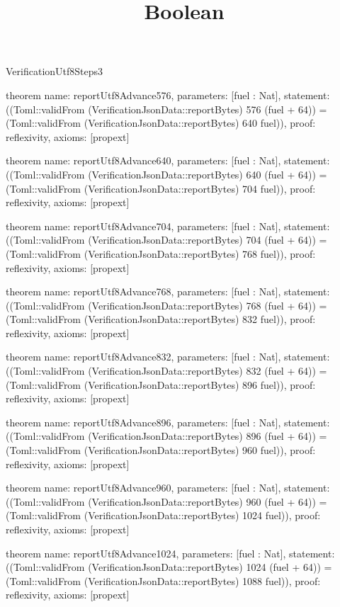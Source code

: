 \begin{lexlean}{VerificationUtf8Steps3}
\title{Boolean}
\begin{semanticmodule}

theorem{
  name: reportUtf8Advance576,
  parameters: [fuel : Nat],
  statement: ((Toml::validFrom (VerificationJsonData::reportBytes) 576 (fuel + 64)) = (Toml::validFrom (VerificationJsonData::reportBytes) 640 fuel)),
  proof: reflexivity{},
  axioms: [propext]
}

theorem{
  name: reportUtf8Advance640,
  parameters: [fuel : Nat],
  statement: ((Toml::validFrom (VerificationJsonData::reportBytes) 640 (fuel + 64)) = (Toml::validFrom (VerificationJsonData::reportBytes) 704 fuel)),
  proof: reflexivity{},
  axioms: [propext]
}

theorem{
  name: reportUtf8Advance704,
  parameters: [fuel : Nat],
  statement: ((Toml::validFrom (VerificationJsonData::reportBytes) 704 (fuel + 64)) = (Toml::validFrom (VerificationJsonData::reportBytes) 768 fuel)),
  proof: reflexivity{},
  axioms: [propext]
}

theorem{
  name: reportUtf8Advance768,
  parameters: [fuel : Nat],
  statement: ((Toml::validFrom (VerificationJsonData::reportBytes) 768 (fuel + 64)) = (Toml::validFrom (VerificationJsonData::reportBytes) 832 fuel)),
  proof: reflexivity{},
  axioms: [propext]
}

theorem{
  name: reportUtf8Advance832,
  parameters: [fuel : Nat],
  statement: ((Toml::validFrom (VerificationJsonData::reportBytes) 832 (fuel + 64)) = (Toml::validFrom (VerificationJsonData::reportBytes) 896 fuel)),
  proof: reflexivity{},
  axioms: [propext]
}

theorem{
  name: reportUtf8Advance896,
  parameters: [fuel : Nat],
  statement: ((Toml::validFrom (VerificationJsonData::reportBytes) 896 (fuel + 64)) = (Toml::validFrom (VerificationJsonData::reportBytes) 960 fuel)),
  proof: reflexivity{},
  axioms: [propext]
}

theorem{
  name: reportUtf8Advance960,
  parameters: [fuel : Nat],
  statement: ((Toml::validFrom (VerificationJsonData::reportBytes) 960 (fuel + 64)) = (Toml::validFrom (VerificationJsonData::reportBytes) 1024 fuel)),
  proof: reflexivity{},
  axioms: [propext]
}

theorem{
  name: reportUtf8Advance1024,
  parameters: [fuel : Nat],
  statement: ((Toml::validFrom (VerificationJsonData::reportBytes) 1024 (fuel + 64)) = (Toml::validFrom (VerificationJsonData::reportBytes) 1088 fuel)),
  proof: reflexivity{},
  axioms: [propext]
}

\end{semanticmodule}
\end{lexlean}
